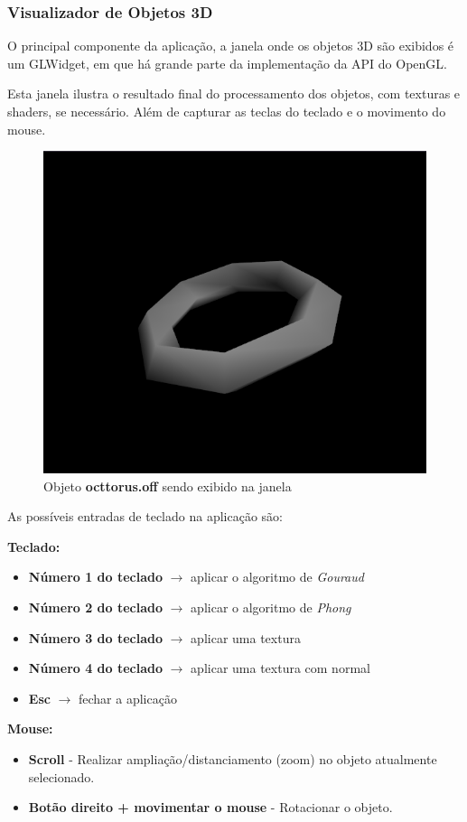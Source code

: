 \documentclass{ol-softwaremanual}
\begin{document}
\newpage

\subsubsection{Visualizador de Objetos 3D}

O principal componente da aplicação, a janela onde os objetos 3D 
são exibidos é um GLWidget, em que há grande parte da implementação da 
API do OpenGL.

Esta janela ilustra o resultado final do processamento dos objetos, com texturas e shaders, se necessário.
Além de capturar as teclas do teclado e o movimento do mouse.


\begin{figure}[H]
    \centering
    \includegraphics[width=.5\textwidth]{opengl.png}
    \caption{Objeto \textbf{octtorus.off} sendo exibido na janela}
\end{figure}

As possíveis entradas de teclado na aplicação são:

\textbf{Teclado:}

\begin{itemize}
    \item \textbf{Número 1 do teclado} $\rightarrow$ aplicar o algoritmo de \emph{Gouraud}
    \item \textbf{Número 2 do teclado} $\rightarrow$ aplicar o algoritmo de \emph{Phong}
    \item \textbf{Número 3 do teclado} $\rightarrow$ aplicar uma textura
    \item \textbf{Número 4 do teclado} $\rightarrow$ aplicar uma textura com normal
    \item \textbf{Esc} $\rightarrow$ fechar a aplicação
\end{itemize}

\textbf{Mouse:}

\begin{itemize}
    \item \textbf{Scroll} - Realizar ampliação/distanciamento (zoom) no objeto 
    atualmente selecionado. 
    \item \textbf{Botão direito + movimentar o mouse} - Rotacionar o objeto.
\end{itemize}
\end{document}
